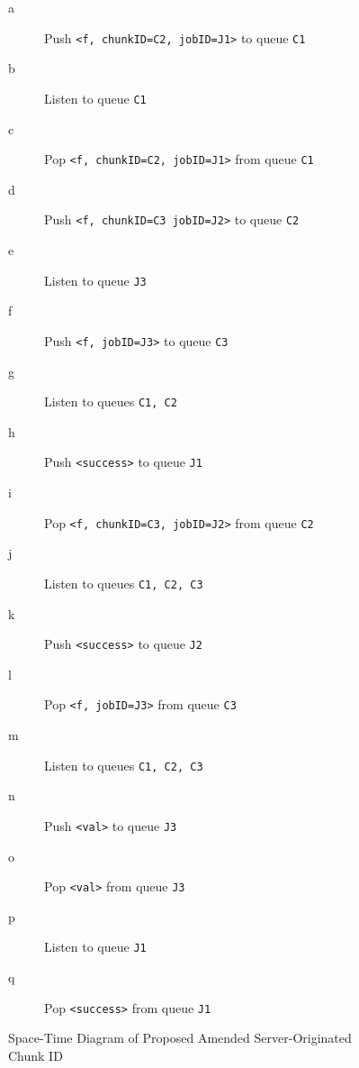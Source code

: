 \begin{figure}
	\setlength{\columnsep}{50pt}
	\begin{multicols}{2}
		\begin{description}
			\item [\textcolor{dark2-1}{a}] Push \texttt{<f, chunkID=C2, jobID=J1>} to queue \texttt{C1}
			\item [\textcolor{mygray}{b}] Listen to queue \texttt{C1}
			\item [\textcolor{dark2-1}{c}] Pop \texttt{<f, chunkID=C2, jobID=J1>} from queue \texttt{C1}
			\item [\textcolor{dark2-3}{d}] Push \texttt{<f, chunkID=C3 jobID=J2>} to queue \texttt{C2}
			\item [\textcolor{dark2-5}{e}] Listen to queue \texttt{J3}
			\item [\textcolor{dark2-5}{f}] Push \texttt{<f, jobID=J3>} to queue \texttt{C3}
			\item [\textcolor{mygray}{g}] Listen to queues \texttt{C1, C2}
			\item [\textcolor{dark2-1}{h}] Push \texttt{<success>} to queue \texttt{J1}
			\item [\textcolor{dark2-3}{i}] Pop \texttt{<f, chunkID=C3, jobID=J2>} from queue \texttt{C2}
			\item [\textcolor{mygray}{j}] Listen to queues \texttt{C1, C2, C3}
			\item [\textcolor{dark2-3}{k}] Push \texttt{<success>} to queue \texttt{J2}
			\item [\textcolor{dark2-5}{l}] Pop \texttt{<f, jobID=J3>} from queue \texttt{C3}
			\item [\textcolor{mygray}{m}] Listen to queues \texttt{C1, C2, C3}
			\item [\textcolor{dark2-5}{n}] Push \texttt{<val>} to queue \texttt{J3}
			\item [\textcolor{dark2-5}{o}] Pop \texttt{<val>} from queue \texttt{J3}
			\item [\textcolor{dark2-6}{p}] Listen to queue \texttt{J1}
			\item [\textcolor{dark2-6}{q}] Pop \texttt{<success>} from queue \texttt{J1}
		\end{description}
	\end{multicols}
	\caption{\label{fig:masi} Space-Time Diagram of Proposed Amended Server-Originated Chunk ID}
\end{figure}

